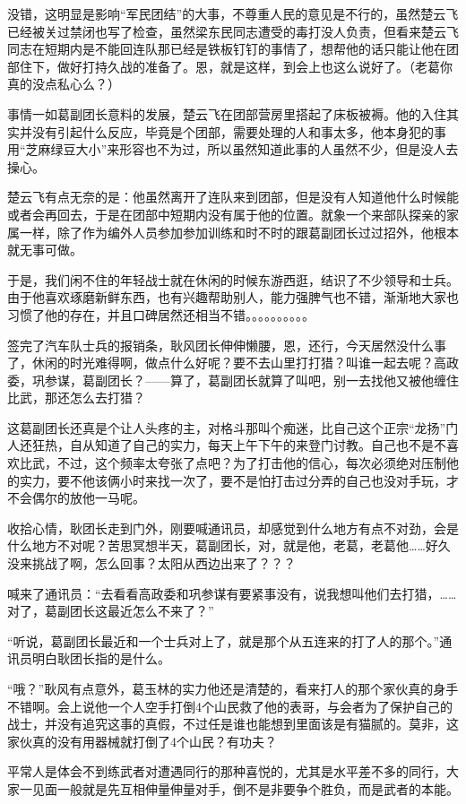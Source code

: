 没错，这明显是影响“军民团结”的大事，不尊重人民的意见是不行的，虽然楚云飞已经被关过禁闭也写了检查，虽然梁东民同志遭受的毒打没人负责，但看来楚云飞同志在短期内是不能回连队那已经是铁板钉钉的事情了，想帮他的话只能让他在团部住下，做好打持久战的准备了。恩，就是这样，到会上也这么说好了。（老葛你真的没点私心么？）

事情一如葛副团长意料的发展，楚云飞在团部营房里搭起了床板被褥。他的入住其实并没有引起什么反应，毕竟是个团部，需要处理的人和事太多，他本身犯的事用“芝麻绿豆大小”来形容也不为过，所以虽然知道此事的人虽然不少，但是没人去操心。

楚云飞有点无奈的是：他虽然离开了连队来到团部，但是没有人知道他什么时候能或者会再回去，于是在团部中短期内没有属于他的位置。就象一个来部队探亲的家属一样，除了作为编外人员参加参加训练和时不时的跟葛副团长过过招外，他根本就无事可做。

于是，我们闲不住的年轻战士就在休闲的时候东游西逛，结识了不少领导和士兵。由于他喜欢琢磨新鲜东西，也有兴趣帮助别人，能力强脾气也不错，渐渐地大家也习惯了他的存在，并且口碑居然还相当不错。。。。。。。。。。

签完了汽车队士兵的报销条，耿风团长伸伸懒腰，恩，还行，今天居然没什么事了，休闲的时光难得啊，做点什么好呢？要不去山里打打猎？叫谁一起去呢？高政委，巩参谋，葛副团长？——算了，葛副团长就算了叫吧，别一去找他又被他缠住比武，那还怎么去打猎？

这葛副团长还真是个让人头疼的主，对格斗那叫个痴迷，比自己这个正宗“龙扬”门人还狂热，自从知道了自己的实力，每天上午下午的来登门讨教。自己也不是不喜欢比武，不过，这个频率太夸张了点吧？为了打击他的信心，每次必须绝对压制他的实力，要不他该俩小时来找一次了，要不是怕打击过分弄的自己也没对手玩，才不会偶尔的放他一马呢。

收拾心情，耿团长走到门外，刚要喊通讯员，却感觉到什么地方有点不对劲，会是什么地方不对呢？苦思冥想半天，葛副团长，对，就是他，老葛，老葛他……好久没来挑战了啊，怎么回事？太阳从西边出来了？？？

喊来了通讯员：“去看看高政委和巩参谋有要紧事没有，说我想叫他们去打猎，……对了，葛副团长这最近怎么不来了？”

“听说，葛副团长最近和一个士兵对上了，就是那个从五连来的打了人的那个。”通讯员明白耿团长指的是什么。

“哦？”耿风有点意外，葛玉林的实力他还是清楚的，看来打人的那个家伙真的身手不错啊。会上说他一个人空手打倒4个山民救了他的表哥，与会者为了保护自己的战士，并没有追究这事的真假，不过任是谁也能想到里面该是有猫腻的。莫非，这家伙真的没有用器械就打倒了4个山民？有功夫？

平常人是体会不到练武者对遭遇同行的那种喜悦的，尤其是水平差不多的同行，大家一见面一般就是先互相伸量伸量对手，倒不是非要争个胜负，而是武者的本能。

